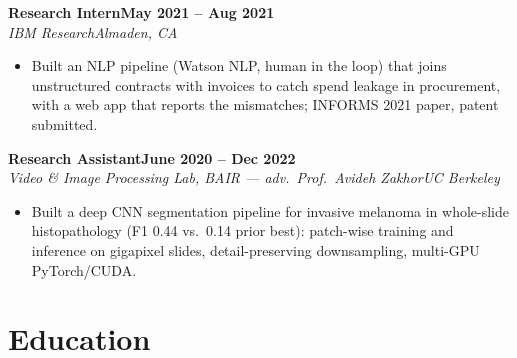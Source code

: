 \documentclass[10pt]{article}
\newcommand{\role}[4]{\par\vspace{3pt}\textbf{#1}\hfill\textbf{#2}\\\textit{#3}\hfill\textit{#4}}
\begin{document}
\role{Research Intern}{May 2021 -- Aug 2021}{IBM Research}{Almaden, CA}
\begin{itemize}
\item Built an NLP pipeline (Watson NLP, human in the loop) that joins unstructured contracts with invoices to catch spend leakage in procurement, with a web app that reports the mismatches; INFORMS 2021 paper, patent submitted.
\end{itemize}

\role{Research Assistant}{June 2020 -- Dec 2022}{Video \& Image Processing Lab, BAIR --- adv.\ Prof.\ Avideh Zakhor}{UC Berkeley}
\begin{itemize}
\item Built a deep CNN segmentation pipeline for invasive melanoma in whole-slide histopathology (F1 0.44 vs.\ 0.14 prior best): patch-wise training and inference on gigapixel slides, detail-preserving downsampling, multi-GPU PyTorch/CUDA.
\end{itemize}


\section*{Education}
\end{document}
